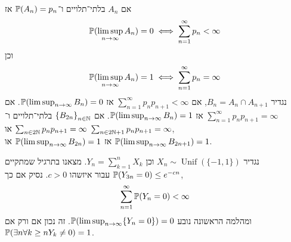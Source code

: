 \begin{example}
	אם $A_n$ בלתי־תלויים ו־$\mathbb{P}(A_n) = p_n$ אז
	\[
		\mathbb{P}(\limsup_{n \to \infty} A_n) = 0 \iff \sum_{n = 1}^{\infty} p_n < \infty
	\]
	וכן
	\[
		\mathbb{P}(\limsup_{n \to \infty} A_n) = 1 \iff \sum_{n = 1}^{\infty} p_n = \infty
	\]
	נגדיר $B_n = A_n \cap A_{n + 1}$, אם $\sum_{n = 1}^{\infty} p_n p_{n + 1} < \infty$ אז $\mathbb{P}(\limsup_{n \to \infty} B_n) = 0$.
	אם $\sum_{n = 1}^{\infty} p_n p_{n + 1} = \infty$ אז $\mathbb{P}(\limsup_{n \to \infty} B_n) = 1$.
	אם ${\{ B_{2n} \}}_{n \in \mathbb{N}}$ בלתי־תלויים ו־$\sum_{n \in 2\mathbb{N}} p_n p_{n + 1} = \infty$ או $\sum_{n \in 2\mathbb{N} + 1} p_n p_{n + 1} = \infty$, \\
	אז $\mathbb{P}(\limsup_{n \to \infty} B_{2n}) = 1$ או $\mathbb{P}(\limsup_{n \to \infty} B_{2n + 1}) = 1$.
\end{example}
\begin{example}
	נגדיר $X_n \sim \operatorname{Unif}(\{-1, 1\})$ וכן $Y_n = \sum_{k = 1}^{n} X_k$.
	מצאנו בתרגיל שמתקיים $\mathbb{P}(Y_{3n} = 0) \le e^{-cn}$ עבור איזשהו $c > 0$.
	נסיק אם כך,
	\[
		\sum_{n = 1}^{\infty} \mathbb{P}(Y_n = 0) < \infty
	\]
	ומהלמה הראשונה נובע $\mathbb{P}(\limsup_{n \to \infty} \{ Y_n = 0 \}) = 0$.
	זה נכון אם ורק אם $\mathbb{P}(\exists n \forall k \ge n Y_k \ne 0) = 1$.
\end{example}


